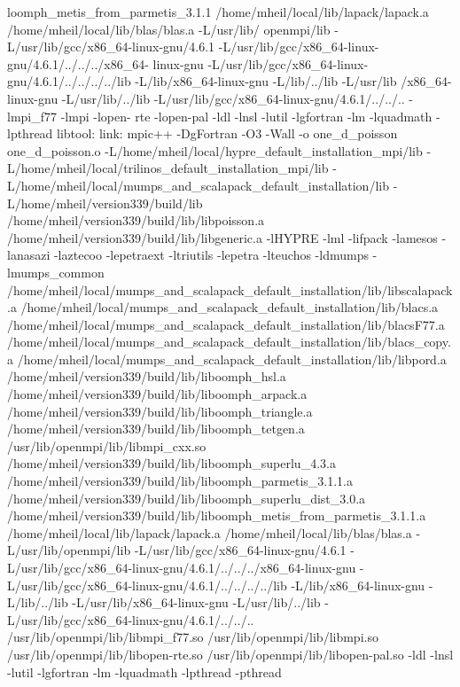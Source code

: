 \begin{DoxyCode}
      loomph\_metis\_from\_parmetis\_3.1.1 /home/mheil/local/lib/lapack/lapack.a /home/mheil/local/lib/blas/blas.a -L/usr/lib/
      openmpi/lib -L/usr/lib/gcc/x86\_64-linux-gnu/4.6.1 -L/usr/lib/gcc/x86\_64-linux-gnu/4.6.1/../../../x86\_64-
      linux-gnu -L/usr/lib/gcc/x86\_64-linux-gnu/4.6.1/../../../../lib -L/lib/x86\_64-linux-gnu -L/lib/../lib -L/usr/lib
      /x86\_64-linux-gnu -L/usr/lib/../lib -L/usr/lib/gcc/x86\_64-linux-gnu/4.6.1/../../.. -lmpi\_f77 -lmpi -lopen-
      rte -lopen-pal -ldl -lnsl -lutil -lgfortran -lm -lquadmath -lpthread 
libtool: link: mpic++ -DgFortran -O3 -Wall -o one\_d\_poisson
one\_d\_poisson.o
-L/home/mheil/local/hypre\_default\_installation\_mpi/lib
-L/home/mheil/local/trilinos\_default\_installation\_mpi/lib
-L/home/mheil/local/mumps\_and\_scalapack\_default\_installation/lib
-L/home/mheil/version339/build/lib
/home/mheil/version339/build/lib/libpoisson.a
/home/mheil/version339/build/lib/libgeneric.a -lHYPRE -lml -lifpack
-lamesos -lanasazi -laztecoo -lepetraext -ltriutils -lepetra -lteuchos
-ldmumps -lmumps\_common
/home/mheil/local/mumps\_and\_scalapack\_default\_installation/lib/libscalapack.a
/home/mheil/local/mumps\_and\_scalapack\_default\_installation/lib/blacs.a
/home/mheil/local/mumps\_and\_scalapack\_default\_installation/lib/blacsF77.a
/home/mheil/local/mumps\_and\_scalapack\_default\_installation/lib/blacs\_copy.a
/home/mheil/local/mumps\_and\_scalapack\_default\_installation/lib/libpord.a
/home/mheil/version339/build/lib/liboomph\_hsl.a
/home/mheil/version339/build/lib/liboomph\_arpack.a
/home/mheil/version339/build/lib/liboomph\_triangle.a
/home/mheil/version339/build/lib/liboomph\_tetgen.a
/usr/lib/openmpi/lib/libmpi\_cxx.so
/home/mheil/version339/build/lib/liboomph\_superlu\_4.3.a
/home/mheil/version339/build/lib/liboomph\_parmetis\_3.1.1.a
/home/mheil/version339/build/lib/liboomph\_superlu\_dist\_3.0.a
/home/mheil/version339/build/lib/liboomph\_metis\_from\_parmetis\_3.1.1.a
/home/mheil/local/lib/lapack/lapack.a
/home/mheil/local/lib/blas/blas.a -L/usr/lib/openmpi/lib
-L/usr/lib/gcc/x86\_64-linux-gnu/4.6.1
-L/usr/lib/gcc/x86\_64-linux-gnu/4.6.1/../../../x86\_64-linux-gnu
-L/usr/lib/gcc/x86\_64-linux-gnu/4.6.1/../../../../lib
-L/lib/x86\_64-linux-gnu -L/lib/../lib -L/usr/lib/x86\_64-linux-gnu
-L/usr/lib/../lib
-L/usr/lib/gcc/x86\_64-linux-gnu/4.6.1/../../.. /usr/lib/openmpi/lib/libmpi\_f77.so
/usr/lib/openmpi/lib/libmpi.so /usr/lib/openmpi/lib/libopen-rte.so
/usr/lib/openmpi/lib/libopen-pal.so -ldl -lnsl -lutil -lgfortran -lm
-lquadmath -lpthread -pthread
\end{DoxyCode}

